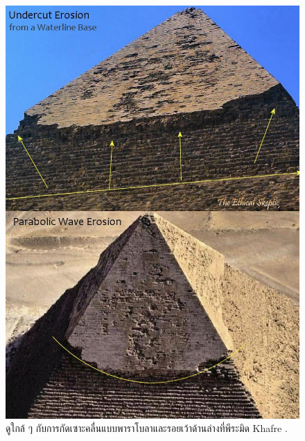\documentclass[10pt,twocolumn,letterpaper]{article}
\begin{document}
\begin{figure}[H]
\begin{center}
   \includegraphics[width=1\linewidth]{wave.jpg}
\end{center}
   \caption{ดูใกล้ ๆ กับการกัดเซาะคลื่นแบบพาราโบลาและรอยเว้าด้านล่างที่พีระมิด Khafre \cite{27}.}
\label{fig:19}
\label{fig:onecol}
\end{figure}
\end{document}
